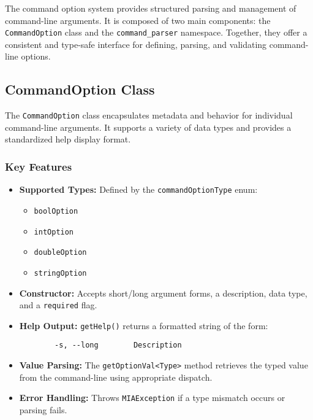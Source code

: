 The command option system provides structured parsing and management of command-line arguments. It is composed of two main components: the \texttt{CommandOption} class and the \texttt{command\_parser} namespace. Together, they offer a consistent and type-safe interface for defining, parsing, and validating command-line options.

\subsection{CommandOption Class}

The \texttt{CommandOption} class encapsulates metadata and behavior for individual command-line arguments. It supports a variety of data types and provides a standardized help display format.

\subsubsection*{Key Features}
\begin{itemize}
	\item \textbf{Supported Types:} Defined by the \texttt{commandOptionType} enum:
	\begin{itemize}
		\item \texttt{boolOption}
		\item \texttt{intOption}
		\item \texttt{doubleOption}
		\item \texttt{stringOption}
	\end{itemize}
	
	\item \textbf{Constructor:} Accepts short/long argument forms, a description, data type, and a \texttt{required} flag.
	
	\item \textbf{Help Output:} \texttt{getHelp()} returns a formatted string of the form:
	\begin{verbatim}
		-s, --long        Description
	\end{verbatim}
	
	\item \textbf{Value Parsing:} The \texttt{getOptionVal<Type>} method retrieves the typed value from the command-line using appropriate dispatch.
	
	\item \textbf{Error Handling:} Throws \texttt{MIAException} if a type mismatch occurs or parsing fails.
\end{itemize}

